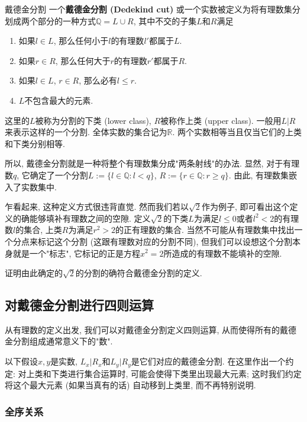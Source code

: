 \begin{definition}{戴德金分割}
一个\textbf{戴德金分割 (Dedekind cut)} 或一个实数被定义为将有理数集分划成两个部分的一种方式$\mathbb{Q}=L\cup R$, 其中不交的子集$L$和$R$满足

\begin{enumerate}
\item 如果$l\in L$, 那么任何小于$l$的有理数$l'$都属于$L$.
\item 如果$r\in R$, 那么任何大于$r$的有理数$r'$都属于$R$.
\item 如果$l\in L$, $r\in R$, 那么必有$l\leq r$.
\item $L$不包含最大的元素.
\end{enumerate}

这里的$L$被称为分割的下类 (lower class), $R$被称作上类 (upper class). 一般用$L|R$来表示这样的一个分割. 全体实数的集合记为$\mathbb{R}$. 两个实数相等当且仅当它们的上类和下类分别相等.
\end{definition}

所以, 戴德金分割就是一种将整个有理数集分成"两条射线"的办法. 显然, 对于有理数$q$, 它确定了一个分割$L:=\{l\in\mathbb{Q}:l<q\}$, $R:=\{r\in\mathbb{Q}:r\geq q\}$. 由此, 有理数集嵌入了实数集中.

乍看起来, 这种定义方式很违背直觉. 然而我们若以$\sqrt{2}$作为例子, 即可看出这个定义的确能够填补有理数之间的空隙. 定义$\sqrt{2}$的下类$L$为满足$l\leq0$或者$l^2<2$的有理数$l$的集合, 上类$R$为满足$r^2>2$的正有理数的集合. 当然不可能从有理数集中找出一个分点来标记这个分割 (这跟有理数对应的分割不同), 但我们可以设想这个分割本身就是一个"标志", 它标记的正是方程$x^2=2$所造成的有理数不能填补的空隙.
\begin{exercise}{}
证明由此确定的$\sqrt{2}$的分割的确符合戴德金分割的定义.
\end{exercise}

\subsection{对戴德金分割进行四则运算}
从有理数的定义出发, 我们可以对戴德金分割定义四则运算, 从而使得所有的戴德金分割组成通常意义下的"数". 

以下假设$x,y$是实数, $L_x| R_x$和$L_y| R_y$是它们对应的戴德金分割. 在这里作出一个约定: 对上类和下类进行集合运算时, 可能会使得下类里出现最大元素; 这时我们约定将这个最大元素 (如果当真有的话) 自动移到上类里, 而不再特别说明.

\subsubsection{全序关系}

